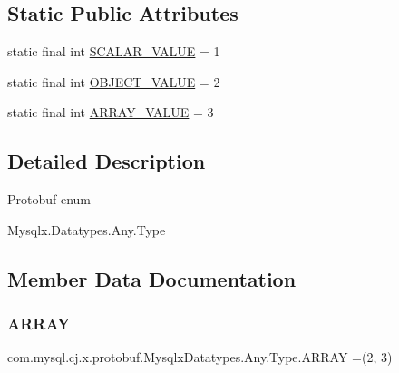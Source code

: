 \subsection*{Static Public Attributes}
\begin{DoxyCompactItemize}
\item 
static final int \mbox{\hyperlink{enumcom_1_1mysql_1_1cj_1_1x_1_1protobuf_1_1_mysqlx_datatypes_1_1_any_1_1_type_a5f32fab5fc3de9186df497c80bc0057b}{S\+C\+A\+L\+A\+R\+\_\+\+V\+A\+L\+UE}} = 1
\item 
static final int \mbox{\hyperlink{enumcom_1_1mysql_1_1cj_1_1x_1_1protobuf_1_1_mysqlx_datatypes_1_1_any_1_1_type_abba143b047a3f183d1e40f8d949ac78d}{O\+B\+J\+E\+C\+T\+\_\+\+V\+A\+L\+UE}} = 2
\item 
static final int \mbox{\hyperlink{enumcom_1_1mysql_1_1cj_1_1x_1_1protobuf_1_1_mysqlx_datatypes_1_1_any_1_1_type_abae573ee6db61e559f2c8d74fb4b58df}{A\+R\+R\+A\+Y\+\_\+\+V\+A\+L\+UE}} = 3
\end{DoxyCompactItemize}


\subsection{Detailed Description}
Protobuf enum
\begin{DoxyCode}
Mysqlx.Datatypes.Any.Type 
\end{DoxyCode}
 

\subsection{Member Data Documentation}
\mbox{\label{enumcom_1_1mysql_1_1cj_1_1x_1_1protobuf_1_1_mysqlx_datatypes_1_1_any_1_1_type_ab2305401fad8b75a43c56a6f3c62c2b6}} 
\subsubsection{\texorpdfstring{A\+R\+R\+AY}{ARRAY}}
{\footnotesize\ttfamily com.\+mysql.\+cj.\+x.\+protobuf.\+Mysqlx\+Datatypes.\+Any.\+Type.\+A\+R\+R\+AY =(2, 3)}

